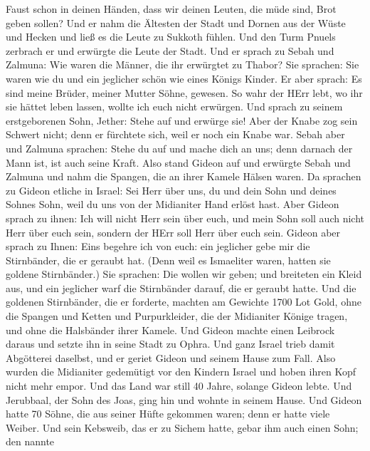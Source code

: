 Faust schon in deinen Händen, dass wir deinen Leuten, die müde sind,
Brot geben sollen?  Und er nahm die Ältesten der Stadt und
Dornen aus der Wüste und Hecken und ließ es die Leute zu Sukkoth fühlen.
 Und den Turm Pnuels zerbrach er und erwürgte die Leute der
Stadt.  Und er sprach zu Sebah und Zalmuna: Wie waren die
Männer, die ihr erwürgtet zu Thabor? Sie sprachen: Sie waren wie du und
ein jeglicher schön wie eines Königs Kinder.  Er aber
sprach: Es sind meine Brüder, meiner Mutter Söhne, gewesen. So wahr der
HErr lebt, wo ihr sie hättet leben lassen, wollte ich euch nicht
erwürgen.  Und sprach zu seinem erstgeborenen Sohn, Jether:
Stehe auf und erwürge sie! Aber der Knabe zog sein Schwert nicht; denn
er fürchtete sich, weil er noch ein Knabe war.  Sebah aber
und Zalmuna sprachen: Stehe du auf und mache dich an uns; denn darnach
der Mann ist, ist auch seine Kraft. Also stand Gideon auf und erwürgte
Sebah und Zalmuna und nahm die Spangen, die an ihrer Kamele Hälsen
waren.  Da sprachen zu Gideon etliche in Israel: Sei Herr
über uns, du und dein Sohn und deines Sohnes Sohn, weil du uns von der
Midianiter Hand erlöst hast.  Aber Gideon sprach zu ihnen:
Ich will nicht Herr sein über euch, und mein Sohn soll auch nicht Herr
über euch sein, sondern der HErr soll Herr über euch sein. 
Gideon aber sprach zu Ihnen: Eins begehre ich von euch: ein jeglicher
gebe mir die Stirnbänder, die er geraubt hat. (Denn weil es Ismaeliter
waren, hatten sie goldene Stirnbänder.)  Sie sprachen: Die
wollen wir geben; und breiteten ein Kleid aus, und ein jeglicher warf
die Stirnbänder darauf, die er geraubt hatte.  Und die
goldenen Stirnbänder, die er forderte, machten am Gewichte 1700 Lot
Gold, ohne die Spangen und Ketten und Purpurkleider, die der Midianiter
Könige tragen, und ohne die Halsbänder ihrer Kamele.  Und
Gideon machte einen Leibrock daraus und setzte ihn in seine Stadt zu
Ophra. Und ganz Israel trieb damit Abgötterei daselbst, und er geriet
Gideon und seinem Hause zum Fall.  Also wurden die
Midianiter gedemütigt vor den Kindern Israel und hoben ihren Kopf nicht
mehr empor. Und das Land war still 40 Jahre, solange Gideon lebte.
 Und Jerubbaal, der Sohn des Joas, ging hin und wohnte in
seinem Hause.  Und Gideon hatte 70 Söhne, die aus seiner
Hüfte gekommen waren; denn er hatte viele Weiber.  Und sein
Kebsweib, das er zu Sichem hatte, gebar ihm auch einen Sohn; den nannte
